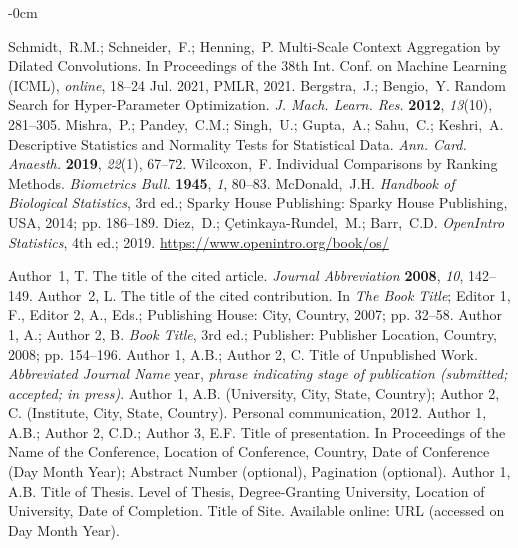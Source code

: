 \documentclass[sensors,article,submit,pdftex,moreauthors]{Definitions/mdpi}
\begin{document}
\begin{adjustwidth}{-\extralength}{0cm}
\begin{thebibliography}{999}
	Schmidt,~R.M.; Schneider,~F.; Henning,~P. Multi-Scale Context Aggregation by Dilated Convolutions. In Proceedings of the 38th Int. Conf. on Machine Learning (ICML), {\em online}, 18--24 Jul. 2021, PMLR, 2021.
	Bergstra,~J.; Bengio,~Y. Random Search for Hyper-Parameter Optimization. {\em J. Mach. Learn. Res.} {\bf 2012}, {\em 13}(10), 281--305.
	Mishra,~P.; Pandey,~C.M.; Singh,~U.; Gupta,~A.; Sahu,~C.; Keshri,~A. Descriptive Statistics and Normality Tests for Statistical Data. {\em Ann. Card. Anaesth.} {\bf 2019}, {\em 22}(1), 67--72. 	
	Wilcoxon,~F. Individual Comparisons by Ranking Methods. {\em Biometrics Bull.} {\bf 1945}, {\em 1}, 80--83.
	McDonald,~J.H. \textit{Handbook of Biological Statistics}, 3rd ed.; Sparky House Publishing: Sparky House Publishing, USA, 2014; pp. 186--189.
	Diez,~D.; \c{C}etinkaya-Rundel,~M.; Barr,~C.D. \textit{OpenIntro Statistics}, 4th ed.; 2019. \url{https://www.openintro.org/book/os/}
	
	Author~1, T. The title of the cited article. {\em Journal Abbreviation} {\bf 2008}, {\em 10}, 142--149.
	Author~2, L. The title of the cited contribution. In {\em The Book Title}; Editor 1, F., Editor 2, A., Eds.; Publishing House: City, Country, 2007; pp. 32--58.
	Author 1, A.; Author 2, B. \textit{Book Title}, 3rd ed.; Publisher: Publisher Location, Country, 2008; pp. 154--196.
	Author 1, A.B.; Author 2, C. Title of Unpublished Work. \textit{Abbreviated Journal Name} year, \textit{phrase indicating stage of publication (submitted; accepted; in press)}.
	Author 1, A.B. (University, City, State, Country); Author 2, C. (Institute, City, State, Country). Personal communication, 2012.
	Author 1, A.B.; Author 2, C.D.; Author 3, E.F. Title of presentation. In Proceedings of the Name of the Conference, Location of Conference, Country, Date of Conference (Day Month Year); Abstract Number (optional), Pagination (optional).
	Author 1, A.B. Title of Thesis. Level of Thesis, Degree-Granting University, Location of University, Date of Completion.
	Title of Site. Available online: URL (accessed on Day Month Year).
\end{thebibliography}


\end{adjustwidth}
\end{document}
